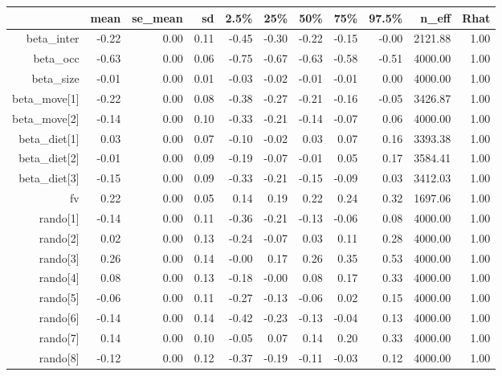 \begin{table}[ht]
\centering
\begin{tabular}{rrrrrrrrrrr}
  \hline
 & mean & se\_mean & sd & 2.5\% & 25\% & 50\% & 75\% & 97.5\% & n\_eff & Rhat \\ 
  \hline
beta\_inter & -0.22 & 0.00 & 0.11 & -0.45 & -0.30 & -0.22 & -0.15 & -0.00 & 2121.88 & 1.00 \\ 
  beta\_occ & -0.63 & 0.00 & 0.06 & -0.75 & -0.67 & -0.63 & -0.58 & -0.51 & 4000.00 & 1.00 \\ 
  beta\_size & -0.01 & 0.00 & 0.01 & -0.03 & -0.02 & -0.01 & -0.01 & 0.00 & 4000.00 & 1.00 \\ 
  beta\_move[1] & -0.22 & 0.00 & 0.08 & -0.38 & -0.27 & -0.21 & -0.16 & -0.05 & 3426.87 & 1.00 \\ 
  beta\_move[2] & -0.14 & 0.00 & 0.10 & -0.33 & -0.21 & -0.14 & -0.07 & 0.06 & 4000.00 & 1.00 \\ 
  beta\_diet[1] & 0.03 & 0.00 & 0.07 & -0.10 & -0.02 & 0.03 & 0.07 & 0.16 & 3393.38 & 1.00 \\ 
  beta\_diet[2] & -0.01 & 0.00 & 0.09 & -0.19 & -0.07 & -0.01 & 0.05 & 0.17 & 3584.41 & 1.00 \\ 
  beta\_diet[3] & -0.15 & 0.00 & 0.09 & -0.33 & -0.21 & -0.15 & -0.09 & 0.03 & 3412.03 & 1.00 \\ 
  fv & 0.22 & 0.00 & 0.05 & 0.14 & 0.19 & 0.22 & 0.24 & 0.32 & 1697.06 & 1.00 \\ 
  rando[1] & -0.14 & 0.00 & 0.11 & -0.36 & -0.21 & -0.13 & -0.06 & 0.08 & 4000.00 & 1.00 \\ 
  rando[2] & 0.02 & 0.00 & 0.13 & -0.24 & -0.07 & 0.03 & 0.11 & 0.28 & 4000.00 & 1.00 \\ 
  rando[3] & 0.26 & 0.00 & 0.14 & -0.00 & 0.17 & 0.26 & 0.35 & 0.53 & 4000.00 & 1.00 \\ 
  rando[4] & 0.08 & 0.00 & 0.13 & -0.18 & -0.00 & 0.08 & 0.17 & 0.33 & 4000.00 & 1.00 \\ 
  rando[5] & -0.06 & 0.00 & 0.11 & -0.27 & -0.13 & -0.06 & 0.02 & 0.15 & 4000.00 & 1.00 \\ 
  rando[6] & -0.14 & 0.00 & 0.14 & -0.42 & -0.23 & -0.13 & -0.04 & 0.13 & 4000.00 & 1.00 \\ 
  rando[7] & 0.14 & 0.00 & 0.10 & -0.05 & 0.07 & 0.14 & 0.20 & 0.33 & 4000.00 & 1.00 \\ 
  rando[8] & -0.12 & 0.00 & 0.12 & -0.37 & -0.19 & -0.11 & -0.03 & 0.12 & 4000.00 & 1.00 \\ 

\end{tabular}
\end{table}
